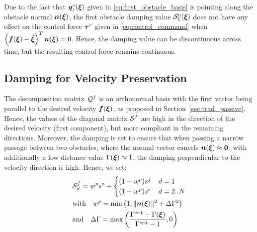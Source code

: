 Due to the fact that $\boldsymbol{q}_1^o(\boldsymbol{\xi})$ given in \eqref{eq:first_obstacle_basis} is pointing along the obstacle normal $\boldsymbol{n}(\boldsymbol{\xi})$, the first obstacle damping value $\mathcal{S}_1^{\mathrm{o}} (\boldsymbol{\xi})$ does not have any effect on the control force $\boldsymbol{\tau}^c$ given in \eqref{eq:control_command} when $\left(\boldsymbol{f}(\boldsymbol{\xi}) -  \boldsymbol{\dot \xi} \right)^T \boldsymbol{n}(\boldsymbol{\xi}) = 0$.
Hence, the damping value can be discontinuous across time, but the resulting control force remains continuous.


\subsection{Damping for Velocity Preservation}
The decomposition matrix $\mathcal{Q}^{f}$ is an orthonormal basis with the first vector being parallel to the desired velocity $\boldsymbol{f}(\boldsymbol{\xi})$, as proposed in Section~\ref{sec:trad_passive}. Hence, the values of the diagonal matrix $\mathcal{S}^{f}$ are high in the direction of the desired velocity (first component), but more compliant in the remaining directions. 
Moreover, the damping is set to ensure that when passing a narrow passage between two obstacles, where the normal vector cancels $\boldsymbol{n}(\boldsymbol{\xi}) \approx \boldsymbol{0}$, with additionally a low distance value $\Gamma(\boldsymbol{\xi}) \approx 1$, the damping perpendicular to the velocity direction is high. Hence, we set:
\begin{equation}
  \begin{split}
  & \matd{S}^{f}_{d} =
  w^p s^{\mathrm{o}} + 
  \begin{cases}
   (1- w^p) s^f & d = 1 \\
   (1- w^p) s^s & d = 2 .. N 
  \end{cases} \\
  & \text{with} \quad
   w^p = \min \left(1,  \| \vecs n(\vecs \xi) \|^2 +  \Delta \Gamma ^2 \right) \\
   & \text{and} \quad \Delta \Gamma = \max \left(\frac{\Gamma^{\mathrm{crit}} -\Gamma(\vecs \xi)}{\Gamma^{\mathrm{crit}} - 1}, 0\right)
  \end{split}
  \label{eq:velocity_damping}
\end{equation}

